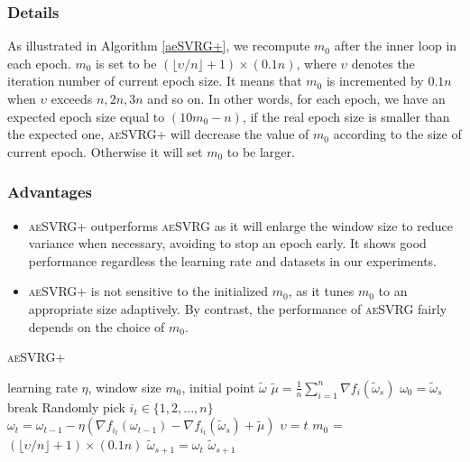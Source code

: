 \documentclass[conference]{IEEEtran}
\begin{document}
 \subsubsection{Details}
 As illustrated in Algorithm \ref{aeSVRG+}, we recompute $m_0$ after the inner loop in each epoch. $m_0$ is set to be $(\lfloor \upsilon/n \rfloor+1) \times (0.1n)$, where $\upsilon$ denotes the iteration number of current epoch size. It means that $m_0$ is incremented by $0.1n$ when $\upsilon$ exceeds $n,2n,3n$ and so on. In other words, for each epoch, we have an expected epoch size equal to $(10m_0-n)$, if the real epoch size is smaller than the expected one, \textsc{aeSVRG+} will decrease the value of $m_0$ according to the size of current epoch. Otherwise it will set $m_0$ to be larger.
 
 
 \subsubsection{Advantages}
 \begin{itemize}
 \item \textsc{aeSVRG+} outperforms \textsc{aeSVRG} as it will enlarge the window size to reduce variance when necessary, avoiding to stop an epoch early. It shows good performance regardless the learning rate and datasets in  our experiments. 
 \item \textsc{aeSVRG+} is not sensitive to the initialized $m_0$, as it tunes $m_0$ to an appropriate size adaptively. By contrast, the performance of \textsc{aeSVRG} fairly depends on the choice of $m_0$.
 \end{itemize}
 
 

 \begin{algorithm}[t]
 	\caption{\textsc{aeSVRG+}}
	\label{aeSVRG+}
	\begin{algorithmic}[1]
	\Require learning rate $\eta$, window size $m_0$, initial point $\tilde{\omega}$
		\State $\tilde{\mu} = \frac{1}{n}\sum\limits_{i=1}^{n}\nabla f_{i}(\tilde{\omega}_{s})$
		\State $\omega_0 = \tilde{\omega}_s$
			\State break
			\EndIf
			\State Randomly pick $i_t\in\{1, 2, ..., n\}$
			\State $\omega_t = \omega_{t-1} - \eta(\nabla f_{i_t}(\omega_{t-1}) - \nabla f_{i_t}(\tilde{\omega}_s)+\tilde{\mu})$
		\EndFor
		\State $\upsilon = t$	
		\State $m_0$ = $(\lfloor \upsilon/n \rfloor+1) \times (0.1n)$
		\State $\tilde{\omega}_{s+1} = \omega_{t}$
	\EndFor
	\State \Return $\tilde{\omega}_{s+1}$
	\end{algorithmic}
\end{algorithm}
 
\end{document}
